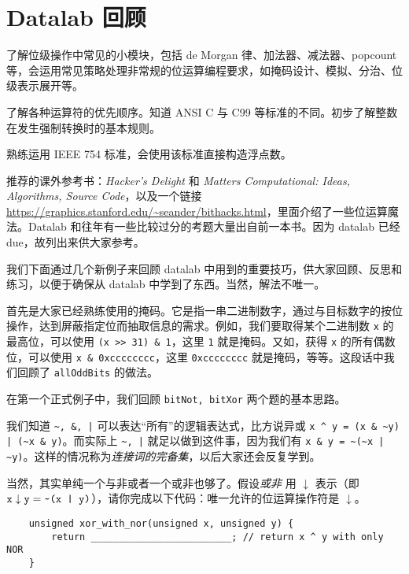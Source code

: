\chapter{Datalab 回顾}\thispagestyle{empty}
    \begin{summary}
        \begin{compactitem}
            \item 了解位级操作中常见的小模块，包括 de Morgan 律、加法器、减法器、popcount 等，会运用常见策略处理非常规的位运算编程要求，如掩码设计、模拟、分治、位级表示展开等。
            \item 了解各种运算符的优先顺序。知道 ANSI C 与 C99 等标准的不同。初步了解整数在发生强制转换时的基本规则。
            \item 熟练运用 IEEE 754 标准，会使用该标准直接构造浮点数。
            \item 推荐的课外参考书：\textit{Hacker's Delight} 和 \textit{Matters Computational: Ideas, Algorithms, Source Code}，以及一个链接 \url{https://graphics.stanford.edu/~seander/bithacks.html}，里面介绍了一些位运算魔法。Datalab 和往年有一些比较过分的考题大量出自前一本书。因为 datalab 已经 due，故列出来供大家参考。
        \end{compactitem}
    \end{summary}

    我们下面通过几个新例子来回顾 datalab 中用到的重要技巧，供大家回顾、反思和练习，以便于确保从 datalab 中学到了东西。当然，解法不唯一。

    首先是大家已经熟练使用的掩码。它是指一串二进制数字，通过与目标数字的按位操作，达到屏蔽指定位而抽取信息的需求。例如，我们要取得某个二进制数 \texttt{x} 的最高位，可以使用 \verb|(x >> 31) & 1|，这里 \texttt{1} 就是掩码。又如，获得 \texttt{x} 的所有偶数位，可以使用 \verb|x & 0xcccccccc|，这里 \texttt{0xcccccccc} 就是掩码，等等。这段话中我们回顾了 \texttt{allOddBits} 的做法。

    在第一个正式例子中，我们回顾 \texttt{bitNot, bitXor} 两个题的基本思路。
    \begin{example}[de Morgan 律]
        我们知道 \verb+~, &, |+ 可以表达“所有”的逻辑表达式，比方说异或 \verb+x ^ y = (x & ~y) | (~x & y)+。而实际上 \verb+~, |+ 就足以做到这件事，因为我们有 \verb+x & y = ~(~x | ~y)+。这样的情况称为\emph{连接词的完备集}，以后大家还会反复学到。

        当然，其实单纯一个与非或者一个或非也够了。假设\emph{或非} 用 $\downarrow$ 表示（即 $\texttt{x} \downarrow \texttt{y} = \verb+~(x | y)+$），请你完成以下代码：唯一允许的位运算操作符是 $\downarrow$。
        \begin{verbatim}
    unsigned xor_with_nor(unsigned x, unsigned y) {
        return _________________________; // return x ^ y with only NOR
    }
        \end{verbatim}
    \end{example}

